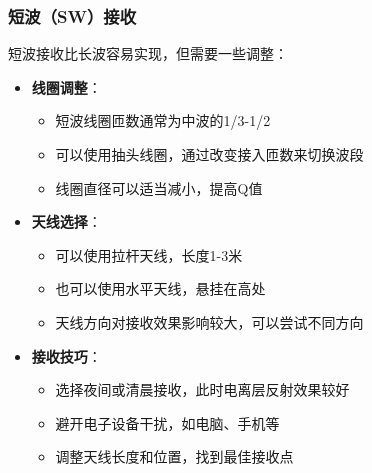 \documentclass[12pt,UTF8]{ctexbook}
\begin{document}
\subsubsection{短波（SW）接收}
短波接收比长波容易实现，但需要一些调整：
\begin{itemize}[leftmargin=3.5em]
    \item \textbf{线圈调整}：
    \begin{itemize}[leftmargin=3.5em]
        \item 短波线圈匝数通常为中波的1/3-1/2
        \item 可以使用抽头线圈，通过改变接入匝数来切换波段
        \item 线圈直径可以适当减小，提高Q值
    \end{itemize}
    \item \textbf{天线选择}：
    \begin{itemize}[leftmargin=3.5em]
        \item 可以使用拉杆天线，长度1-3米
        \item 也可以使用水平天线，悬挂在高处
        \item 天线方向对接收效果影响较大，可以尝试不同方向
    \end{itemize}
    \item \textbf{接收技巧}：
    \begin{itemize}[leftmargin=3.5em]
        \item 选择夜间或清晨接收，此时电离层反射效果较好
        \item 避开电子设备干扰，如电脑、手机等
        \item 调整天线长度和位置，找到最佳接收点
    \end{itemize}
\end{itemize}
\end{document}
